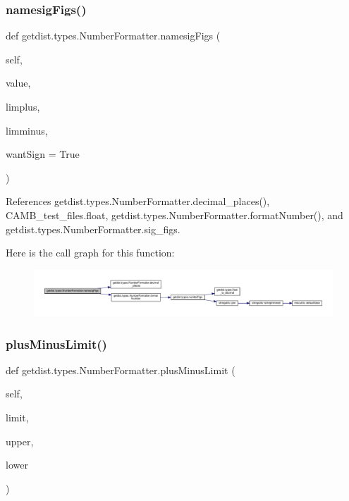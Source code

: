 \subsubsection{\texorpdfstring{namesig\+Figs()}{namesigFigs()}}
{\footnotesize\ttfamily def getdist.\+types.\+Number\+Formatter.\+namesig\+Figs (\begin{DoxyParamCaption}\item[{}]{self,  }\item[{}]{value,  }\item[{}]{limplus,  }\item[{}]{limminus,  }\item[{}]{want\+Sign = {\ttfamily True} }\end{DoxyParamCaption})}



References getdist.\+types.\+Number\+Formatter.\+decimal\+\_\+places(), C\+A\+M\+B\+\_\+test\+\_\+files.\+float, getdist.\+types.\+Number\+Formatter.\+format\+Number(), and getdist.\+types.\+Number\+Formatter.\+sig\+\_\+figs.

Here is the call graph for this function\+:
\nopagebreak
\begin{figure}[H]
\begin{center}
\leavevmode
\includegraphics[width=350pt]{classgetdist_1_1types_1_1NumberFormatter_a8155a1cfc8dfb1430639147398d6e444_cgraph}
\end{center}
\end{figure}
\mbox{\label{classgetdist_1_1types_1_1NumberFormatter_adaac15103cbb1c4df06f083555f8d2aa}} 
\subsubsection{\texorpdfstring{plus\+Minus\+Limit()}{plusMinusLimit()}}
{\footnotesize\ttfamily def getdist.\+types.\+Number\+Formatter.\+plus\+Minus\+Limit (\begin{DoxyParamCaption}\item[{}]{self,  }\item[{}]{limit,  }\item[{}]{upper,  }\item[{}]{lower }\end{DoxyParamCaption})}



